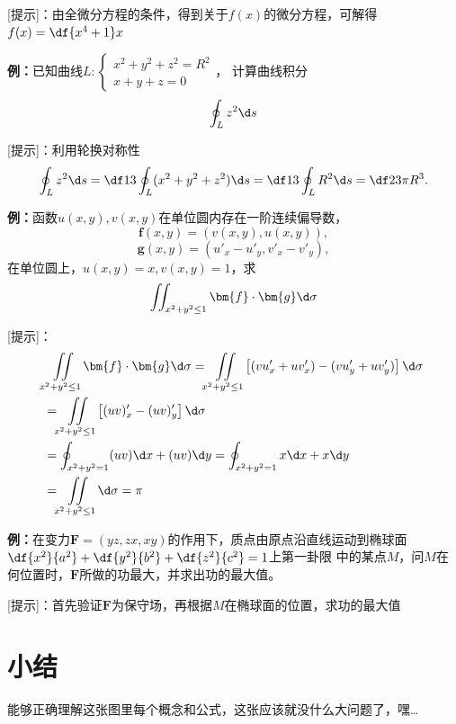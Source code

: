 [提示]：由全微分方程的条件，得到关于$f(x)$的微分方程，可解得$f(x)=\df{x^4+1}x$

{\bf 例：}已知曲线$L:\left\{\begin{array}{l}
	x^2+y^2+z^2=R^2\\ x+y+z=0
\end{array}\right.$，
计算曲线积分
$$\oint_Lz^2\d s$$

[提示]：利用轮换对称性
$$\oint_Lz^2\d s=\df13\oint_L(x^2+y^2+z^2)\d s
=\df13\oint_LR^2\d s=\df23\pi R^3.$$

{\bf 例：}函数$u(x,y),v(x,y)$在单位圆内存在一阶连续偏导数，
$$\bm{f}(x,y)=(v(x,y),u(x,y)),$$
$$\bm{g}(x,y)=\left(u'_x-u'_y,v'_x-v'_y\right),$$
在单位圆上，$u(x,y)=x,v(x,y)=1$，求
$$\iint_{x^2+y^2\leq 1}\bm{f}\cdot\bm{g}\d\sigma$$

[提示]：
\begin{align}
	&\iint\limits_{x^2+y^2\leq 1}\bm{f}\cdot\bm{g}\d\sigma\notag
    =\iint\limits_{x^2+y^2\leq 1}\left[(vu'_x+uv'_x)-
	(vu'_y+uv'_y)\right]\d\sigma\notag\\
	&=\iint\limits_{x^2+y^2\leq 1}\left[(uv)'_x-(uv)'_y\right]
	\d\sigma\notag\\
	&=\oint_{x^2+y^2=1}(uv)\d x+(uv)\d y
	=\oint_{x^2+y^2=1}x\d x+x\d y\notag\\
	&=\iint\limits_{x^2+y^2\leq 1}\d\sigma=\pi\notag
\end{align}

{\bf 例：}在变力$\bm{F}=(yz,zx,xy)$的作用下，质点由原点沿直线运动到椭球面
$\df{x^2}{a^2}+\df{y^2}{b^2}+\df{z^2}{c^2}=1$上第一卦限
中的某点$M$，问$M$在何位置时，$\bm{F}$所做的功最大，并求出功的最大值。

[提示]：首先验证$\bm{F}$为保守场，再根据$M$在椭球面的位置，求功的最大值

\section{小结}

能够正确理解这张图里每个概念和公式，这张应该就没什么大问题了，嘿\ldots

\bigskip

